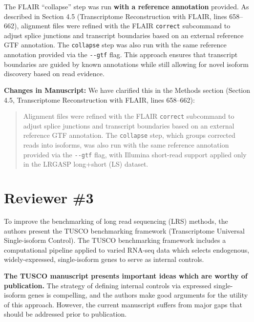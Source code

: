 \documentclass[11pt]{article}
\begin{document}
\begin{responseboxnew}
The FLAIR ``collapse'' step was run \textbf{with a reference annotation} provided. As described in Section 4.5 (Transcriptome Reconstruction with FLAIR, lines 658--662), alignment files were refined with the FLAIR \texttt{correct} subcommand to adjust splice junctions and transcript boundaries based on an external reference GTF annotation. The \texttt{collapse} step was also run with the same reference annotation provided via the \texttt{-{}-gtf} flag. This approach ensures that transcript boundaries are guided by known annotations while still allowing for novel isoform discovery based on read evidence.

\vspace{0.3cm}
\textbf{Changes in Manuscript:} We have clarified this in the Methods section (Section 4.5, Transcriptome Reconstruction with FLAIR, lines 658--662):

\begin{quote}
Alignment files were refined with the FLAIR \texttt{correct} subcommand to adjust splice junctions and transcript boundaries based on an external reference GTF annotation. The \texttt{collapse} step, which groups corrected reads into isoforms, was also run with the same reference annotation provided via the \texttt{-{}-gtf} flag, with Illumina short-read support applied only in the LRGASP long+short (LS) dataset.
\end{quote}
\end{responseboxnew}

\newpage

\section{Reviewer \#3}

\begin{positiveremarks}
To improve the benchmarking of long read sequencing (LRS) methods, the authors present the TUSCO benchmarking framework (Transcriptome Universal Single-isoform Control). The TUSCO benchmarking framework includes a computational pipeline applied to varied RNA-seq data which selects endogenous, widely-expressed, single-isoform genes to serve as internal controls.

\vspace{0.2cm}
\textbf{The TUSCO manuscript presents important ideas which are worthy of publication.} The strategy of defining internal controls via expressed single-isoform genes is compelling, and the authors make good arguments for the utility of this approach. However, the current manuscript suffers from major gaps that should be addressed prior to publication.
\end{positiveremarks}
\end{document}
